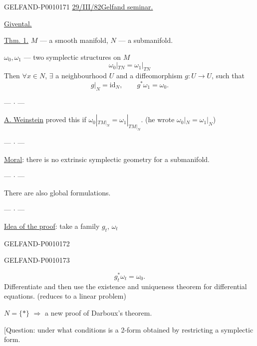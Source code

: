 \begin{GelfandAdjacentEvidence}{GELFAND-P001017}{1}
\underline{29/III/82}\qquad\underline{Gelfand seminar.}

\underline{Givental.}

\underline{Thm. 1.} $M$ --- a smooth manifold, $N$ --- a submanifold.

$\omega_0,\omega_1$ --- two symplectic structures on $M$
\[
\omega_0|_{TN}=\omega_1|_{TN}
\]
Then $\forall x\in N$, $\exists$ a neighbourhood $U$ and a diffeomorphism
$g:U\to U$, such that
\[
g|_N=\mathrm{id}_N,\qquad g^*\omega_1=\omega_0.
\]

\begin{center}--- $\cdot$ ---\end{center}
\underline{A. Weinstein} proved this if
$\omega_0|_{TM|_N}=\omega_1|_{TM|_N}$.
(he wrote $\omega_0|_N=\omega_1|_N$)

\begin{center}--- $\cdot$ ---\end{center}
\underline{Moral}: there is no extrinsic symplectic geometry for a submanifold.

\begin{center}--- $\cdot$ ---\end{center}
There are also global formulations.

\begin{center}--- $\cdot$ ---\end{center}
\underline{Idea of the proof}: take a family $g_t$, $\omega_t$
\end{GelfandAdjacentEvidence}
\begin{GelfandAdjacentEvidence}{GELFAND-P001017}{2}


\end{GelfandAdjacentEvidence}
\begin{GelfandAdjacentEvidence}{GELFAND-P001017}{3}

\[
g_t^*\omega_t=\omega_0.
\]
Differentiate and then use the existence and uniqueness theorem for differential equations. (reduces to a linear problem)

$N=\{*\}$ $\Rightarrow$ a new proof of Darboux’s theorem.

[Question: under what conditions is a 2-form obtained by restricting a symplectic form.
\end{GelfandAdjacentEvidence}
